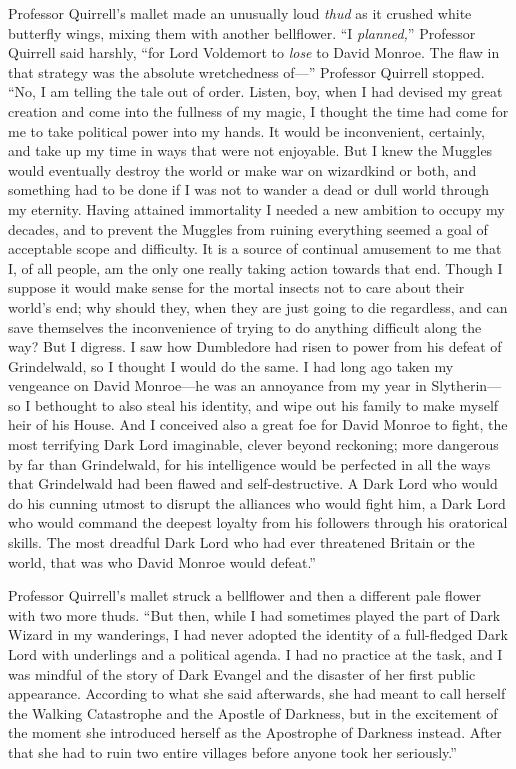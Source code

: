 Professor Quirrell’s mallet made an unusually loud \emph{thud} as it crushed white butterfly wings, mixing them with another bellflower. “I \emph{planned,}” Professor Quirrell said harshly, “for Lord Voldemort to \emph{lose} to David Monroe. The flaw in that strategy was the absolute wretchedness of—” Professor Quirrell stopped. “No, I am telling the tale out of order. Listen, boy, when I had devised my great creation and come into the fullness of my magic, I thought the time had come for me to take political power into my hands. It would be inconvenient, certainly, and take up my time in ways that were not enjoyable. But I knew the Muggles would eventually destroy the world or make war on wizardkind or both, and something had to be done if I was not to wander a dead or dull world through my eternity. Having attained immortality I needed a new ambition to occupy my decades, and to prevent the Muggles from ruining everything seemed a goal of acceptable scope and difficulty. It is a source of continual amusement to me that I, of all people, am the only one really taking action towards that end. Though I suppose it would make sense for the mortal insects not to care about their world’s end; why should they, when they are just going to die regardless, and can save themselves the inconvenience of trying to do anything difficult along the way? But I digress. I saw how Dumbledore had risen to power from his defeat of Grindelwald, so I thought I would do the same. I had long ago taken my vengeance on David Monroe—he was an annoyance from my year in Slytherin—so I bethought to also steal his identity, and wipe out his family to make myself heir of his House. And I conceived also a great foe for David Monroe to fight, the most terrifying Dark Lord imaginable, clever beyond reckoning; more dangerous by far than Grindelwald, for his intelligence would be perfected in all the ways that Grindelwald had been flawed and self-destructive. A Dark Lord who would do his cunning utmost to disrupt the alliances who would fight him, a Dark Lord who would command the deepest loyalty from his followers through his oratorical skills. The most dreadful Dark Lord who had ever threatened Britain or the world, that was who David Monroe would defeat.”

Professor Quirrell’s mallet struck a bellflower and then a different pale flower with two more thuds. “But then, while I had sometimes played the part of Dark Wizard in my wanderings, I had never adopted the identity of a full-fledged Dark Lord with underlings and a political agenda. I had no practice at the task, and I was mindful of the story of Dark Evangel and the disaster of her first public appearance. According to what she said afterwards, she had meant to call herself the Walking Catastrophe and the Apostle of Darkness, but in the excitement of the moment she introduced herself as the Apostrophe of Darkness instead. After that she had to ruin two entire villages before anyone took her seriously.”


